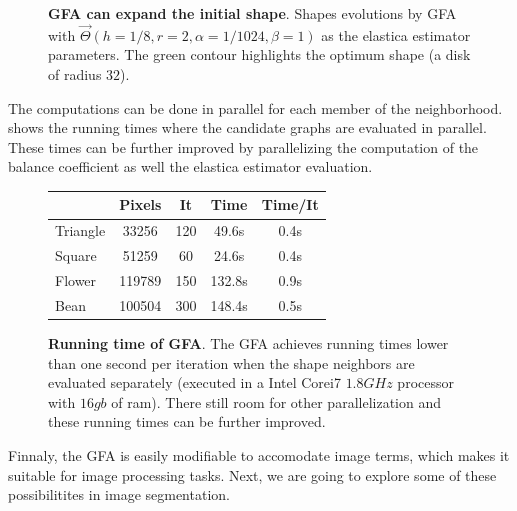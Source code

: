 \documentclass[review]{siamart220329}
\begin{document}
\begin{figure}
\caption{\textbf{GFA can expand the initial shape}. Shapes evolutions by GFA with $\vec{\Theta}(h=1/8,r=2,\alpha=1/1024, \beta=1)$ as the elastica estimator parameters. The green contour highlights the optimum shape (a disk of radius $32$).}
\label{fig:graph-flow-expand}
\end{figure}
%
%
The computations can be done in parallel for each member of the neighborhood. shows the running times where the candidate graphs are evaluated in parallel. These times can be further improved by parallelizing the computation of the balance coefficient as well the elastica estimator evaluation.
%
%
\begin{figure}[h!]
\center
\captionsetup{type=table}
\footnotesize
	\caption{\textbf{Running time of GFA}. The GFA achieves running times lower than one second per iteration when the shape neighbors are evaluated separately (executed in a Intel Corei7 $1.8GHz$ processor with $16gb$ of ram). There still room for other parallelization and these running times can be further improved.}\label{tab:summary-graph-flow-running-time} 
\begin{tabular}{|l|c|c|c|c|}
\hline
& Pixels & It & Time & Time/It\\
\hline
Triangle & 33256 & 120 & 49.6s & 0.4s \\
Square & 51259 & 60 & 24.6s & 0.4s \\
Flower & 119789 & 150 & 132.8s & 0.9s \\
Bean & 100504 & 300 & 148.4s & 0.5s \\
\hline
\end{tabular}
\end{figure}
%
%
Finnaly, the GFA is easily modifiable to accomodate image terms, which makes it suitable for image processing tasks. Next, we are going to explore some of these possibilitites in image segmentation.
%
%
\end{document}
